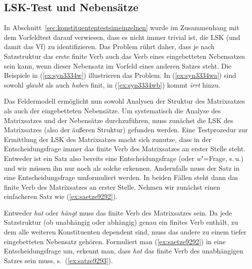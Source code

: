 \subsection{LSK-Test und Nebensätze}

\label{sec:lsktest}

In Abschnitt~\ref{sec:konstituententestsimeinzelnen} wurde im Zusammenhang mit dem Vorfeldtest darauf verwiesen, dass es nicht immer trivial ist, die LSK (und damit das Vf) zu identifizieren.
Das Problem rührt daher, dass je nach Satzstruktur das erste finite Verb auch das Verb eines eingebetteten Nebensatzes sein kann, wenn dieser Nebensatz \zB im Vorfeld eines anderen Satzes steht.
Die Beispiele in (\ref{ex:syn3334w}) illustrieren das Problem.
In (\ref{ex:syn3334wa}) sind sowohl \textit{glaubt} als auch \textit{haben} finit, in (\ref{ex:syn3334wb}) kommt \textit{irrt} hinzu.

\begin{exe}
  \ex\label{ex:syn3334w}
  \begin{xlist}
  \end{xlist}
\end{exe}

Das Feldermodell ermöglicht nun sowohl Analysen der Struktur des Matrixsatzes als auch der eingebetteten Nebensätze.
Um systematisch die Analyse des Matrixsatzes und der Nebensätze durchzuführen, muss zunächst die LSK des Matrixsatzes (also der äußeren Struktur) gefunden werden.
Eine Testprozedur zur Ermittlung der LSK des Matrixsatzes macht sich zunutze, dass in der Entscheidungsfrage immer das finite Verb des Matrixsatzes an erster Stelle steht.
Entweder ist ein Satz also bereits eine Entscheidungsfrage (oder \textit{w}"=Frage, s.\,u.) und wir müssen ihn nur noch als solche erkennen.
Andernfalls muss der Satz in eine Entscheidungsfrage umformuliert werden.
In beiden Fällen steht dann das finite Verb des Matrixsatzes an erster Stelle.
Nehmen wir zunächst einen einfacheren Satz wie (\ref{ex:saetze9292}).

\begin{exe}
\end{exe}

Entweder \textit{hat} oder \textit{hängt} muss das finite Verb des Matrixsatzes sein.
Da jede Satzstruktur (ob unabhängig oder abhängig) genau ein finites Verb enthält, zu dem alle weiteren Konstituenten dependent sind, muss das andere zu einem tiefer eingebetteten Nebensatz gehören.
Formuliert man (\ref{ex:saetze9292}) in eine Entscheidungsfrage um, erkennt man, dass \textit{hat} das finite Verb des unabhängigen Satzes sein muss, s.\ (\ref{ex:satze9293}).

